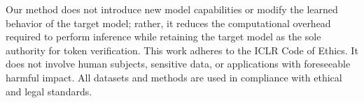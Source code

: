 Our method does not introduce new model capabilities or modify the learned behavior of the target model; rather, it reduces the computational overhead required to perform inference while retaining the target model as the sole authority for token verification. This work adheres to the ICLR Code of Ethics. It does not involve human subjects, sensitive data, or applications with foreseeable harmful impact. All datasets and methods are used in compliance with ethical and legal standards.
